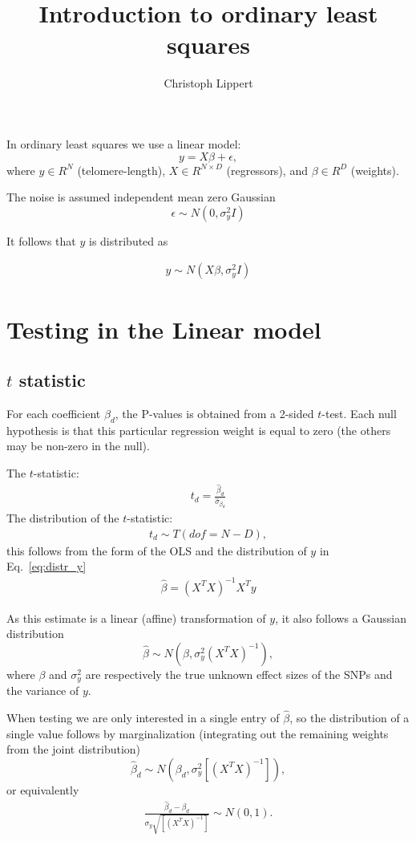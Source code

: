\documentclass{scrartcl}
\begin{document}
\title{\bf Introduction to ordinary least squares}
\author{Christoph Lippert}
\maketitle
In ordinary least squares we use a linear model:
$$
y=X\beta + \epsilon,
$$
where $y\in R^N$ (telomere-length), $X\in R^{N \times D}$ (regressors), and $\beta\in R^{D}$ (weights).

The noise is assumed independent mean zero Gaussian
$$
\epsilon \sim N(0,\sigma_y^2I)
$$

It follows that $y$ is distributed as

\begin{align}
\label{eq:distr_y}
y\sim N(X\beta,\sigma^2_yI)
\end{align}
\section{Testing in the Linear model}
\subsection{\bf $t$ statistic}

For each coefficient $\beta_d$, the P-values is obtained from a 2-sided $t$-test. Each null hypothesis is that this particular regression weight is equal to zero (the others may be non-zero in the null).


The $t$-statistic:
\begin{align}
\label{eq:ttest}
t_d = \frac{\hat\beta_d}{\hat\sigma_{\beta_d}}
\end{align}
The distribution of the $t$-statistic:
\begin{align}
t_d\sim T(dof = N-D),
\end{align}
this follows from the form of the OLS and the distribution of $y$ in Eq.~\eqref{eq:distr_y}
\begin{align*}
\hat\beta=(X^TX)^{-1}X^Ty
\end{align*}

As this estimate is a linear (affine) transformation of $y$, it also follows a Gaussian distribution
$$
\hat\beta\sim N(\beta, \sigma_y^2(X^T X)^{-1}),
$$
where $\beta$ and $\sigma_y^2$ are respectively the true unknown effect sizes of the SNPs and  the variance of $y$.

When testing we are only interested in a single entry of $\hat\beta$, so the distribution of a single value follows by marginalization (integrating out the remaining weights from the joint distribution)
$$
\hat\beta_d\sim N\left(\beta_d, \sigma_y^2\left[(X^T X)^{-1}\right]\right),
$$
or equivalently
\begin{align}
\label{eq:distr_beta}
\frac{\hat\beta_d-\beta_d}{\sigma_y\sqrt{\left[(X^T X)^{-1}\right]}}\sim N\left(0, 1\right).
\end{align}
\end{document}
